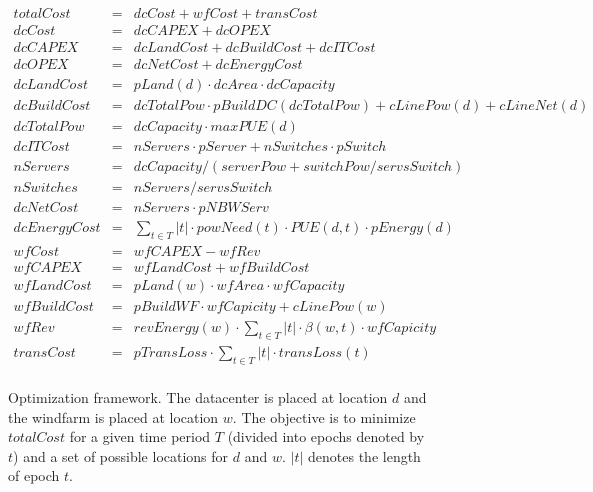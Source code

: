 \begin{figure*}
\begin{eqnarray}
	totalCost & = & dcCost + wfCost + transCost \\
	dcCost & = & dcCAPEX + dcOPEX \\
        dcCAPEX & = & dcLandCost + dcBuildCost + dcITCost \\
        dcOPEX & = & dcNetCost + dcEnergyCost \\
        dcLandCost & = & pLand(d) \cdot dcArea \cdot dcCapacity \\
        dcBuildCost & = & dcTotalPow \cdot pBuildDC(dcTotalPow) +
            cLinePow(d) + cLineNet(d) \\
        dcTotalPow & = & dcCapacity \cdot maxPUE(d) \\
        dcITCost & = & nServers \cdot pServer + nSwitches \cdot
            pSwitch \\
        nServers & = & dcCapacity / (serverPow + switchPow / servsSwitch)\\
        nSwitches & = & nServers / servsSwitch\\
        dcNetCost & = & nServers \cdot pNBWServ \\
        dcEnergyCost & = & \sum_{t \in T} {|t| \cdot powNeed(t) \cdot PUE(d,t) \cdot pEnergy(d) } \\
 	wfCost & = & wfCAPEX - wfRev  \\
        wfCAPEX & = & wfLandCost + wfBuildCost \\
        wfLandCost & = & pLand(w) \cdot wfArea \cdot wfCapacity \\
        wfBuildCost & = & pBuildWF \cdot wfCapicity + cLinePow(w) \\
        wfRev & = & revEnergy(w) \cdot  \sum_{t \in T}{ |t| \cdot
            \beta(w,t) \cdot wfCapicity } \\
        transCost & = & pTransLoss \cdot \sum_{t \in T}{ |t| \cdot transLoss(t)} \\%
\end{eqnarray}
\caption{Optimization framework.  The datacenter is placed at location $d$ and the windfarm is placed at location $w$.  The objective is to minimize $totalCost$ for a given time period $T$ (divided into epochs denoted by $t$) and a set of possible locations for $d$ and $w$.  $|t|$ denotes the length of epoch $t$.}
\label{fig:optimization}
\end{figure*}


